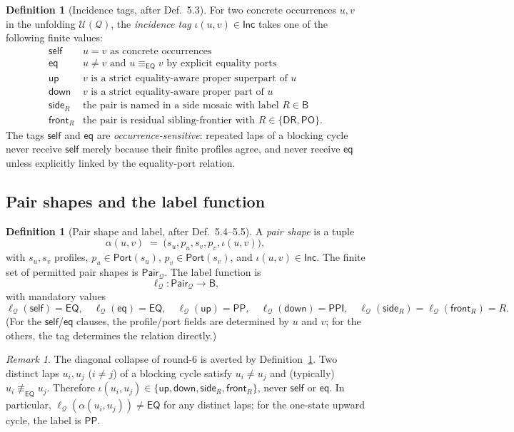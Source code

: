 \documentclass[11pt]{article}
\theoremstyle{definition}
\newtheorem{definition}[theorem]{Definition}
\theoremstyle{remark}
\newtheorem{remark}[theorem]{Remark}
\newcommand{\DR}{\mathsf{DR}}
\newcommand{\PO}{\mathsf{PO}}
\newcommand{\PP}{\mathsf{PP}}
\newcommand{\PPI}{\mathsf{PPI}}
\newcommand{\EQ}{\mathsf{EQ}}
\newcommand{\Base}{\mathsf{B}}
\newcommand{\Q}{\mathcal Q}
\newcommand{\U}{\mathcal U}
\newcommand{\Pair}{\mathsf{Pair}}
\newcommand{\Inc}{\mathsf{Inc}}
\newcommand{\Port}{\mathsf{Port}}
\newcommand{\eqc}{\equiv_{\EQ}}
\newcommand{\self}{\mathsf{self}}
\newcommand{\eqtag}{\mathsf{eq}}
\newcommand{\up}{\mathsf{up}}
\newcommand{\down}{\mathsf{down}}
\newcommand{\side}{\mathsf{side}}
\newcommand{\front}{\mathsf{front}}
\begin{document}
\begin{definition}[Incidence tags, after \cite{GPT55Round7Sketch} Def.~5.3]
\label{def:incidence}
For two concrete occurrences $u,v$ in the unfolding $\U(\Q)$, the
\emph{incidence tag} $\iota(u,v)\in\Inc$ takes one of the following
finite values:
\[
\begin{array}{ll}
\self  & u=v \text{ as concrete occurrences}\\
\eqtag & u\ne v \text{ and } u\eqc v \text{ by explicit equality ports}\\
\up    & v \text{ is a strict equality-aware proper superpart of } u\\
\down  & v \text{ is a strict equality-aware proper part of } u\\
\side_R & \text{the pair is named in a side mosaic with label }R\in\Base\\
\front_R & \text{the pair is residual sibling-frontier with }R\in\{\DR,\PO\}.
\end{array}
\]
The tags $\self$ and $\eqtag$ are \emph{occurrence-sensitive}: repeated
laps of a blocking cycle never receive $\self$ merely because their
finite profiles agree, and never receive $\eqtag$ unless explicitly
linked by the equality-port relation.
\end{definition}

\subsection{Pair shapes and the label function}

\begin{definition}[Pair shape and label, after \cite{GPT55Round7Sketch} Def.~5.4--5.5]
A \emph{pair shape} is a tuple
\[
  \alpha(u,v)\;=\;\bigl(s_u,p_u,s_v,p_v,\iota(u,v)\bigr),
\]
with $s_u,s_v$ profiles, $p_u\in\Port(s_u)$, $p_v\in\Port(s_v)$, and
$\iota(u,v)\in\Inc$.  The finite set of permitted pair shapes is
$\Pair_\Q$.  The label function is
\[
  \ell_\Q:\Pair_\Q\to\Base,
\]
with mandatory values
\[
  \ell_\Q(\self)=\EQ,\quad
  \ell_\Q(\eqtag)=\EQ,\quad
  \ell_\Q(\up)=\PP,\quad
  \ell_\Q(\down)=\PPI,\quad
  \ell_\Q(\side_R)=\ell_\Q(\front_R)=R.
\]
(For the $\self$/$\eqtag$ clauses, the profile/port fields are
determined by $u$ and $v$; for the others, the tag determines the
relation directly.)
\end{definition}

\begin{remark}\label{rem:no-collapse}
The diagonal collapse of round-6 is averted by Definition~\ref{def:incidence}.
Two distinct laps $u_i,u_j$ ($i\ne j$) of a blocking cycle satisfy
$u_i\ne u_j$ and (typically) $u_i\not\eqc u_j$.  Therefore
$\iota(u_i,u_j)\in\{\up,\down,\side_R,\front_R\}$, never $\self$ or
$\eqtag$.  In particular, $\ell_\Q(\alpha(u_i,u_j))\ne\EQ$ for any
distinct laps; for the one-state upward cycle, the label is $\PP$.
\end{remark}
\end{document}
